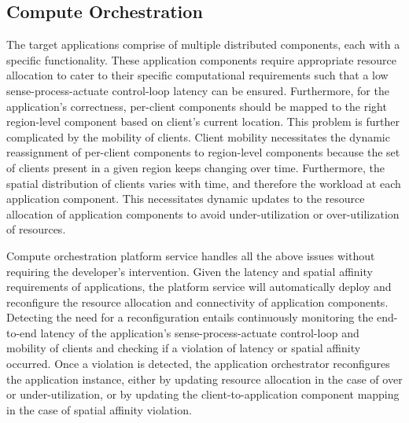 \subsection{Compute Orchestration}
The target applications comprise of multiple distributed components, each with a specific functionality. These application components require appropriate resource allocation to cater to their specific computational requirements such that a low sense-process-actuate control-loop latency can be ensured. Furthermore, for the application's correctness, per-client components should be mapped to the right region-level component based on client's current location. This problem is further complicated by the mobility of clients. Client mobility necessitates the dynamic reassignment of per-client components to region-level components because the set of clients present in a given region keeps changing over time. Furthermore, the spatial distribution of clients varies with time, and therefore the workload at each application component. This necessitates dynamic updates to the resource allocation of application components to avoid under-utilization or over-utilization of resources. 
\par Compute orchestration platform service handles all the above issues without requiring the developer's intervention. Given the latency and spatial affinity requirements of applications, the platform service will automatically deploy and reconfigure the resource allocation and connectivity of application components. Detecting the need for a reconfiguration entails continuously monitoring the end-to-end latency of the application's sense-process-actuate control-loop and mobility of clients and checking if a violation of latency or spatial affinity occurred. Once a violation is detected, the application orchestrator reconfigures the application instance, either by updating resource allocation in the case of over or under-utilization, or by updating the client-to-application component mapping in the case of spatial affinity violation.

